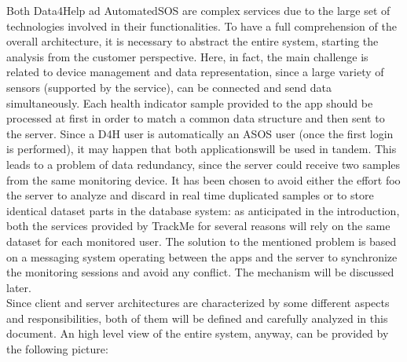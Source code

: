 

\begin{flushleft}

	
{}
Both Data4Help ad AutomatedSOS are complex services due to the large set of technologies involved in their functionalities. To have a full comprehension of the overall architecture, it is necessary to abstract the entire system, starting the analysis from the customer perspective. Here, in fact, the main challenge is related to device management and data representation, since a large variety of sensors (supported by the service), can be connected and send data simultaneously. Each health indicator sample provided to the app should be processed at first in order to match a common data structure and then sent to the server. Since a D4H user is automatically an ASOS user (once the first login is performed), it may happen that both applicationswill be used in tandem. This leads to a problem of data redundancy, since the server could receive two samples from the same monitoring device. It has been chosen to avoid either the effort foo the server to analyze and discard in real time duplicated samples or to store identical dataset parts in the database system: as anticipated in the introduction, both the services provided by TrackMe for several reasons will rely on the same dataset for each monitored user. The solution to the mentioned problem is based on a messaging system operating between the apps and the server to synchronize the monitoring sessions and avoid any conflict. The mechanism will be discussed later.\\
Since client and server architectures are characterized by some different aspects and responsibilities, both of them will be defined and carefully analyzed in this document. An high level view of the entire system, anyway, can be provided by the following picture:


\end{flushleft}
